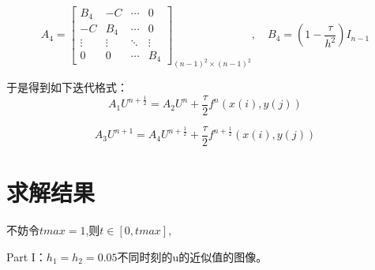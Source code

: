 \documentclass[12pt,a4paper]{article}
\begin{document}
\begin{equation}
A_4 = \left[                 
\begin{array}{cccc}
B_4& -C &\cdots  & 0\\
-C& B_4 &\cdots& 0\\
\vdots  & \vdots & \ddots & \vdots \\
0& 0 &\cdots  &B_4
\end{array}
\right ]_{(n-1)^2 \times (n-1)^2},\quad
B_4 =(1-\frac{\tau}{h^2}) I_{n-1}  
\end{equation}

于是得到如下迭代格式：
$$A_1 U^{n+\frac{1}{2}} = A_2 U^{n} + \frac{\tau}{2} f^n(x(i),y(j)) $$

$$A_3 U^{n+1} = A_4 U^{n+\frac{1}{2}} + \frac{\tau}{2} f^{n+\frac{1}{2}}(x(i),y(j)) $$
\section{求解结果}
不妨令$tmax = 1$,则$t \in [0,tmax]$,

Part I：$h_1 = h_2 = 0.05$不同时刻的u的近似值的图像。
\end{document}
